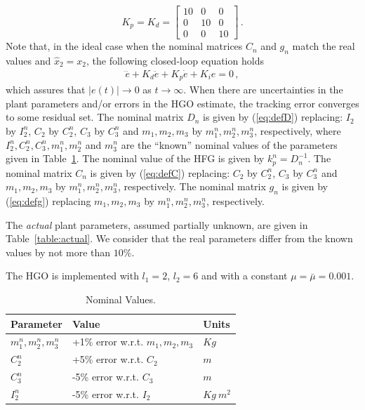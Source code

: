 \documentclass[letterpaper, 10 pt, conference]{ieeeconf}  %
\theoremstyle{plain}
\theoremstyle{definition}
\theoremstyle{remark}
\begin{document}
$$K_p=K_d=\left[\begin{array}{cccc} 10   & 0 & 0\\ 0 & 10 & 0\\ 0 & 0 & 10\end{array} \right ]\,.$$
%
Note that, in the ideal case when the nominal matrices $C_n$ and $g_n$ match the real values and $\hat{x}_2=x_2$, the following closed-loop equation holds
%
\begin{align}
\dddot{e} + K_d \ddot{e} + K_p \dot{e} + K_i e =0\,,
\label{eq:closed}
\end{align}
%
which assures that $|e(t)| \rightarrow 0$ as $t \rightarrow \infty$. When  there are uncertainties in the plant parameters and/or errors in the HGO estimate, the tracking error converges to some residual set.  The nominal matrix $D_n$ is given by (\ref{eq:defD}) replacing: $I_2$ by $I_2^n$,  $C_2$ by $C_2^n$, $C_3$ by $C_3^n$ and $m_1,m_2,m_3$ by $m_1^n, m_2^n, m_3^n$, respectively,  where  $I_2^n, C_2^n, C_3^n, m_1^n, m_2^n$ and $m_3^n$ are  the ``known'' nominal values of the parameters given in Table~\ref{table:nominal}. The nominal value of the HFG is given by $k_p^n=D_n^{-1}$. The nominal matrix $C_n$ is given by (\ref{eq:defC}) replacing: $C_2$ by $C_2^n$, $C_3$ by $C_3^n$ and $m_1,m_2,m_3$ by $m_1^n,m_2^n,m_3^n$, respectively. The nominal matrix $g_n$ is given by (\ref{eq:defg}) replacing  $m_1,m_2,m_3$ by $m_1^n, m_2^n, m_3^n$, respectively.  

The {\em actual} plant parameters, assumed partially unknown, are given in Table~\ref{table:actual}. We consider that  the real parameters differ from the known values by not more than $10\%$. 


The HGO is implemented with $l_1=2$, $l_2=6$ and with a constant $\mu=\bar{\mu}=0.001$.
%
\begin{table}[h!]
\centering
\caption{Nominal Values.} 
\begin{tabular}{ |p{2cm} p{3.5cm} p{1cm}|  }
 \hline
 Parameter & Value & Units\\
 \hline
	$m_1^n,m_2^n, m_3^n$ & +1\% error w.r.t. $m_1,m_2, m_3$ & $Kg$\\
	$C_2^n$ & +5\% error w.r.t. $C_2$ & $m$\\
	$C_3^n$ & -5\% error  w.r.t. $C_3$  & $m$\\
	$I_2^n$ & -5\% error  w.r.t. $I_2$  & $Kg \ m^2$ \\
\hline
\end{tabular}
\label{table:nominal}
\end{table}
%
\end{document}
